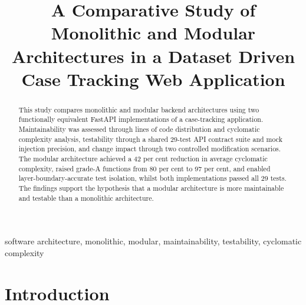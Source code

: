 ﻿\documentclass[conference]{IEEEtran}
\begin{document}
\title{A Comparative Study of Monolithic and Modular Architectures in a Dataset Driven Case Tracking Web Application\\
}

\author{
}

\maketitle

\begin{abstract}
This study compares monolithic and modular backend architectures using two functionally equivalent FastAPI implementations of a case-tracking application. Maintainability was assessed through lines of code distribution and cyclomatic complexity analysis, testability through a shared 29-test API contract suite and mock injection precision, and change impact through two controlled modification scenarios. The modular architecture achieved a 42 per cent reduction in average cyclomatic complexity, raised grade-A functions from 80 per cent to 97 per cent, and enabled layer-boundary-accurate test isolation, whilst both implementations passed all 29 tests. The findings support the hypothesis that a modular architecture is more maintainable and testable than a monolithic architecture.
\end{abstract}

\begin{IEEEkeywords}
software architecture, monolithic, modular, maintainability, testability, cyclomatic complexity
\end{IEEEkeywords}

\section{Introduction}
\end{document}
